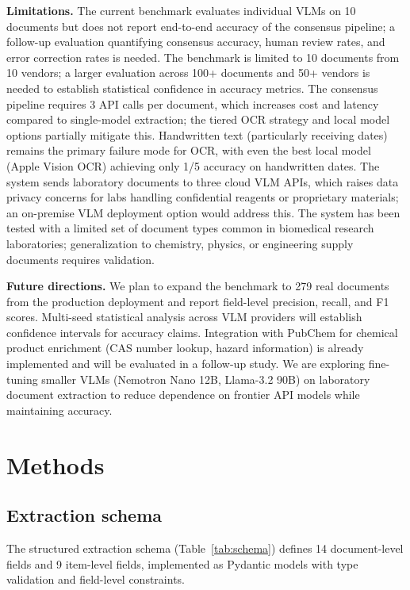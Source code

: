 \documentclass[11pt]{article}
\begin{document}
\textbf{Limitations.} The current benchmark evaluates individual
VLMs on 10 documents but does not report end-to-end accuracy of the
consensus pipeline; a follow-up evaluation quantifying consensus
accuracy, human review rates, and error correction rates is needed.
The benchmark is limited to 10 documents from 10 vendors; a larger
evaluation across 100+ documents and 50+ vendors is needed to establish
statistical confidence in accuracy metrics. The consensus pipeline
requires 3 API calls per document, which increases cost and latency
compared to single-model extraction; the tiered OCR strategy and local
model options partially mitigate this. Handwritten text (particularly
receiving dates) remains the primary failure mode for OCR, with even
the best local model (Apple Vision OCR) achieving only 1/5 accuracy on
handwritten dates. The system sends laboratory documents to three cloud
VLM APIs, which raises data privacy concerns for labs handling
confidential reagents or proprietary materials; an on-premise VLM
deployment option would address this. The system has been tested with a
limited set of document types common in biomedical research
laboratories; generalization to chemistry, physics, or engineering
supply documents requires validation.

\textbf{Future directions.} We plan to expand the benchmark to 279
real documents from the production deployment and report field-level
precision, recall, and F1 scores. Multi-seed statistical analysis across
VLM providers will establish confidence intervals for accuracy claims.
Integration with PubChem for chemical product enrichment (CAS number
lookup, hazard information) is already implemented and will be evaluated
in a follow-up study. We are exploring fine-tuning smaller VLMs
(Nemotron Nano 12B, Llama-3.2 90B) on laboratory document extraction to
reduce dependence on frontier API models while maintaining accuracy.

\section{Methods}
\label{sec:methods}

\subsection{Extraction schema}

The structured extraction schema (Table~\ref{tab:schema}) defines 14
document-level fields and 9 item-level fields, implemented as Pydantic
models with type validation and field-level constraints.
\end{document}
